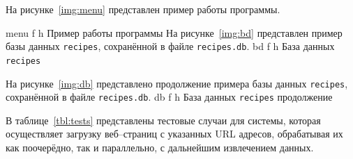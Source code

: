 
На рисунке~\ref{img:menu} представлен пример работы программы.

\FloatBarrier
{}
{menu} 
{f} %
{h} %
{\textwidth} %
{Пример работы программы} %
\FloatBarrier
\newpage
На рисунке~\ref{img:bd} представлен пример базы данных \texttt{recipes}, сохранённой в файле \texttt{recipes.db}.
\FloatBarrier
{}
{bd} 
{f} %
{h} %
{\textwidth} %
{База данных \texttt{recipes}}
\FloatBarrier

На рисунке~\ref{img:db} представлено продолжение примера базы данных \texttt{recipes}, сохранённой в файле \texttt{recipes.db}.
\FloatBarrier
{}
{db} 
{f} %
{h} %
{\textwidth} %
{База данных \texttt{recipes} продолжение}
\FloatBarrier


В таблице~\ref{tbl:tests} представлены тестовые случаи для системы, которая осуществляет загрузку веб--страниц с указанных URL адресов, обрабатывая их как поочерёдно, так и параллельно, с дальнейшим извлечением данных.

